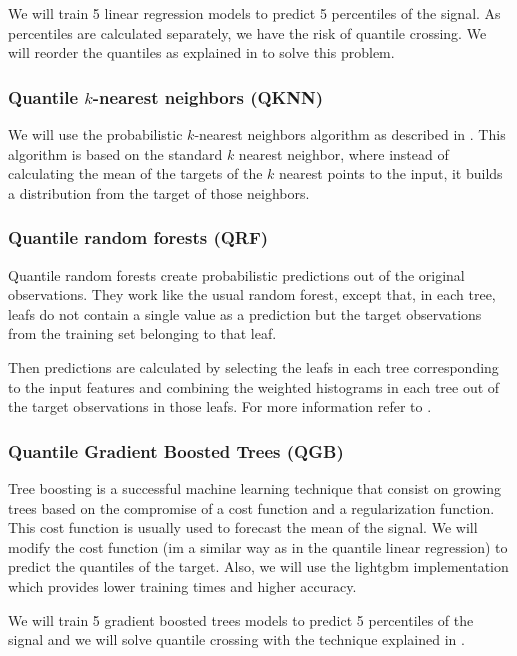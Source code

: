 \documentclass[a4paper,3p,sort&compress]{elsarticle}
\begin{document}
We will train 5 linear regression models to predict 5 percentiles of
the signal. As percentiles are calculated separately, we have the risk
of quantile crossing.  We will reorder the quantiles as explained in
\cite{cross} to solve this problem.

\subsubsection{Quantile $k$-nearest neighbors (QKNN)}

We will use the probabilistic $k$-nearest neighbors algorithm as
described in \cite{quantileknnmangalova}.  This algorithm is based on
the standard $k$ nearest neighbor, where instead of calculating the
mean of the targets of the $k$ nearest points to the input, it builds
a distribution from the target of those neighbors.

\subsubsection{Quantile random forests (QRF)}

Quantile random forests create probabilistic predictions out of the
original observations. They work like the usual random forest, except
that, in each tree, leafs do not contain a single value as a
prediction but the target observations from the training set belonging
to that
leaf.

Then predictions are calculated by selecting the leafs in each tree
corresponding to the input features and combining the weighted
histograms in each tree out of the target observations in those leafs.
For more information refer to \cite{quantregforests}.

\subsubsection{Quantile Gradient Boosted Trees (QGB)}

Tree boosting \cite{friedman_greedy_2001} is a successful
machine learning technique that consist on growing trees based on the
compromise of a cost function and a regularization function. This cost
function is usually used to forecast the mean of the signal. We will
modify the cost function (im a similar way as in the quantile linear
regression) to predict the quantiles of the target. Also, we will use 
the lightgbm implementation \cite{ke_lightgbm:_2017} which provides 
lower training times and higher accuracy.

We will train 5 gradient boosted trees models to predict 5 percentiles
of the \no signal and we will solve quantile 
crossing with the technique
explained in \cite{cross}.
\end{document}
